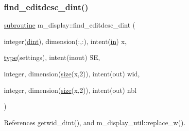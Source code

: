 \subsubsection{\texorpdfstring{find\+\_\+editdesc\+\_\+dint()}{find\_editdesc\_dint()}}
{\footnotesize\ttfamily \hyperlink{M__stopwatch_83_8txt_acfbcff50169d691ff02d4a123ed70482}{subroutine} m\+\_\+display\+::find\+\_\+editdesc\+\_\+dint (\begin{DoxyParamCaption}\item[{integer(\hyperlink{namespacem__display_a73f772e9702cad6f40b78364fde2c7cd}{dint}), dimension(\+:,\+:), intent(\hyperlink{M__journal_83_8txt_afce72651d1eed785a2132bee863b2f38}{in})}]{x,  }\item[{\hyperlink{stop__watch_83_8txt_a70f0ead91c32e25323c03265aa302c1c}{type}(settings), intent(inout)}]{SE,  }\item[{integer, dimension(\hyperlink{what__overview_81_8txt_ab5692ed87074f1d5ec850a9ffa8b5af9}{size}(x,2)), intent(out)}]{wid,  }\item[{integer, dimension(\hyperlink{what__overview_81_8txt_ab5692ed87074f1d5ec850a9ffa8b5af9}{size}(x,2)), intent(out)}]{nbl }\end{DoxyParamCaption})\hspace{0.3cm}{\ttfamily [private]}}



References getwid\+\_\+dint(), and m\+\_\+display\+\_\+util\+::replace\+\_\+w().

